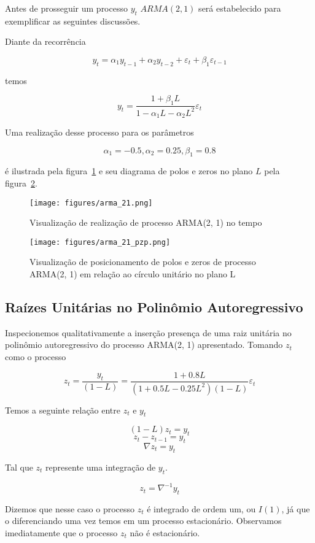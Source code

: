 Antes de prosseguir um processo $y_t$ $ARMA(2, 1)$ será estabelecido para
exemplificar as seguintes discussões.

Diante da recorrência

$$ y_t = \alpha_1 y_{t-1} + \alpha_2 y_{t-2} + \varepsilon_t + \beta_1 \varepsilon_{t-1}$$

temos

$$ y_t = \frac{1 + \beta_1L}{1 - \alpha_1 L - \alpha_2 L^2} \varepsilon_t $$

Uma realização desse processo para os parâmetros

$$\alpha_1 = -0.5, \alpha_2 = 0.25, \beta_1 = 0.8$$

é ilustrada pela figura~\ref{fig:ARMA2-1} e seu diagrama de polos e zeros
no plano $L$ pela figura~\ref{fig:ARMA2-1-pzp}.

\begin{figure}[H]
    \centering
    \texttt{[image: figures/arma\_21.png]}
    \caption{Visualização de realização de processo ARMA(2, 1) no tempo}
    \label{fig:ARMA2-1}
\end{figure}

\begin{figure}[H]
    \centering
    \texttt{[image: figures/arma\_21\_pzp.png]}
    \caption{Visualização de posicionamento de polos e zeros de processo
    ARMA(2, 1) em relação ao círculo unitário no plano L}
    \label{fig:ARMA2-1-pzp}
\end{figure}

\subsection{Raízes Unitárias no Polinômio Autoregressivo}

Inspecionemos qualitativamente a inserção presença de uma raiz unitária no
polinômio autoregressivo do processo ARMA(2, 1) apresentado. Tomando $z_t$
como o processo

$$ z_t = \frac{y_t}{(1 - L)} = \frac{1 + 0.8L}{(1 + 0.5 L - 0.25 L^2)(1 - L)} \varepsilon_t $$

Temos a seguinte relação entre $z_t$ e $y_t$

$$ (1 - L)z_t = y_t $$
$$ z_t - z_{t-1} = y_t $$
$$ \nabla z_t = y_t $$

Tal que $z_t$ represente uma integração de $y_t$.

$$ z_t = \nabla^{-1} y_t $$

Dizemos que nesse caso o processo $z_t$ é integrado de ordem um, ou $I(1)$, já
que o diferenciando uma vez temos em um processo estacionário. Observamos
imediatamente que o processo $z_t$ não é estacionário.

